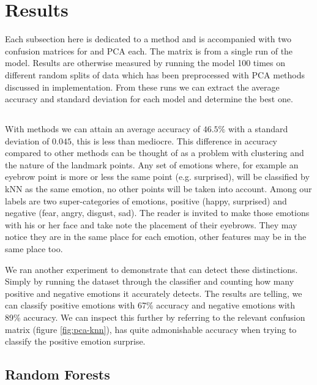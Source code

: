 \section{Results}

Each subsection here is dedicated to a method and is accompanied with two confusion matrices for \tsne and PCA each. The matrix is from a single run of the model. Results are otherwise measured by running the model 100 times on different random splits of data which has been preprocessed with PCA methods discussed in implementation. From these runs we can extract the average accuracy and standard deviation for each model and determine the best one.

\subsection{\knn}


With \knn methods we can attain an average accuracy of $46.5\%$ with a standard deviation of $0.045$, this is less than mediocre. This difference in accuracy compared to other methods can be thought of as a problem with clustering and the nature of the landmark points. Any set of emotions where, for example an eyebrow point is more or less the same point (e.g. surprised), will be classified by kNN as the same emotion, no other points will be taken into account. Among our labels are two super-categories of emotions, positive (happy, surprised) and negative (fear, angry, disgust, sad). The reader is invited to make those emotions with his or her face and take note the placement of their eyebrows. They may notice they are in the same place for each emotion, other features may be in the same place too.

We ran another experiment to demonstrate that \knn can detect these distinctions. Simply by running the dataset through the \knn classifier and counting how many positive and negative emotions it accurately detects. The results are telling, we can classify positive emotions with 67\% accuracy and negative emotions with 89\% accuracy. We can inspect this further by referring to the relevant confusion matrix (figure \ref{fig:pca-knn}), \knn has quite admonishable accuracy when trying to classify the positive emotion surprise.

\subsection{Random Forests}

